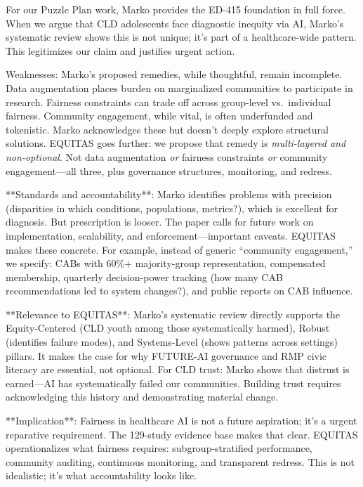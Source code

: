 \documentclass[12pt,twoside]{article}
\begin{document}
For our Puzzle Plan work, Marko provides the ED-415 foundation in full force. When we argue that CLD adolescents face diagnostic inequity via AI, Marko's systematic review shows this is not unique; it's part of a healthcare-wide pattern. This legitimizes our claim and justifies urgent action.

Weaknesses: Marko's proposed remedies, while thoughtful, remain incomplete. Data augmentation places burden on marginalized communities to participate in research. Fairness constraints can trade off across group-level vs.\ individual fairness. Community engagement, while vital, is often underfunded and tokenistic. Marko acknowledges these but doesn't deeply explore structural solutions. EQUITAS goes further: we propose that remedy is \emph{multi-layered and non-optional}. Not data augmentation \textit{or} fairness constraints \textit{or} community engagement---all three, plus governance structures, monitoring, and redress.

**Standards and accountability**: Marko identifies problems with precision (disparities in which conditions, populations, metrics?), which is excellent for diagnosis. But prescription is looser. The paper calls for future work on implementation, scalability, and enforcement---important caveats. EQUITAS makes these concrete. For example, instead of generic ``community engagement,'' we specify: CABs with 60\%+ majority-group representation, compensated membership, quarterly decision-power tracking (how many CAB recommendations led to system changes?), and public reports on CAB influence.

**Relevance to EQUITAS**: Marko's systematic review directly supports the Equity-Centered (CLD youth among those systematically harmed), Robust (identifies failure modes), and Systems-Level (shows patterns across settings) pillars. It makes the case for why FUTURE-AI governance and RMP civic literacy are essential, not optional. For CLD trust: Marko shows that distrust is earned---AI has systematically failed our communities. Building trust requires acknowledging this history and demonstrating material change.

**Implication**: Fairness in healthcare AI is not a future aspiration; it's a urgent reparative requirement. The 129-study evidence base makes that clear. EQUITAS operationalizes what fairness requires: subgroup-stratified performance, community auditing, continuous monitoring, and transparent redress. This is not idealistic; it's what accountability looks like.
\end{document}
